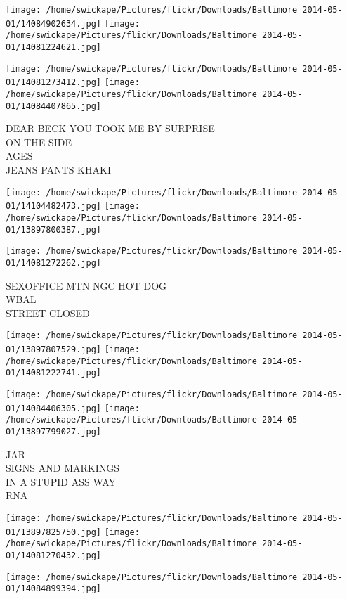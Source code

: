 \documentclass[10pt,letterpaper]{article}
\begin{document}
\texttt{[image: /home/swickape/Pictures/flickr/Downloads/Baltimore 2014-05-01/14084902634.jpg]}
\texttt{[image: /home/swickape/Pictures/flickr/Downloads/Baltimore 2014-05-01/14081224621.jpg]}

\texttt{[image: /home/swickape/Pictures/flickr/Downloads/Baltimore 2014-05-01/14081273412.jpg]}
\texttt{[image: /home/swickape/Pictures/flickr/Downloads/Baltimore 2014-05-01/14084407865.jpg]}

DEAR BECK YOU TOOK ME BY SURPRISE\\
ON THE SIDE\\
AGES\\
JEANS PANTS KHAKI\\
\pagebreak

\texttt{[image: /home/swickape/Pictures/flickr/Downloads/Baltimore 2014-05-01/14104482473.jpg]}
\texttt{[image: /home/swickape/Pictures/flickr/Downloads/Baltimore 2014-05-01/13897800387.jpg]}

\vspace{0.25in}
\texttt{[image: /home/swickape/Pictures/flickr/Downloads/Baltimore 2014-05-01/14081272262.jpg]}

SEXOFFICE MTN NGC HOT DOG\\
WBAL\\
STREET CLOSED\\
\pagebreak

\texttt{[image: /home/swickape/Pictures/flickr/Downloads/Baltimore 2014-05-01/13897807529.jpg]}
\texttt{[image: /home/swickape/Pictures/flickr/Downloads/Baltimore 2014-05-01/14081222741.jpg]}

\texttt{[image: /home/swickape/Pictures/flickr/Downloads/Baltimore 2014-05-01/14084406305.jpg]}
\texttt{[image: /home/swickape/Pictures/flickr/Downloads/Baltimore 2014-05-01/13897799027.jpg]}

JAR\\
SIGNS AND MARKINGS\\
IN A STUPID ASS WAY\\
RNA\\
\pagebreak

\texttt{[image: /home/swickape/Pictures/flickr/Downloads/Baltimore 2014-05-01/13897825750.jpg]}
\texttt{[image: /home/swickape/Pictures/flickr/Downloads/Baltimore 2014-05-01/14081270432.jpg]}

\texttt{[image: /home/swickape/Pictures/flickr/Downloads/Baltimore 2014-05-01/14084899394.jpg]}
\end{document}
